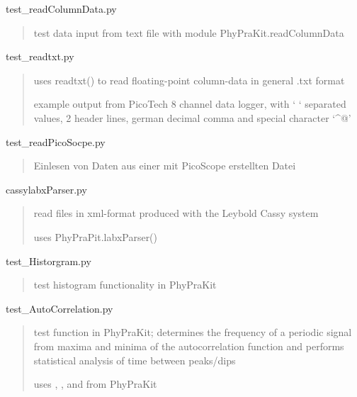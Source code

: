 \documentclass[letterpaper,10pt,english]{sphinxmanual}
\begin{document}
\label{\detokenize{index:module-test_readColumnData}}
test\_readColumnData.py
\begin{quote}

test data input from text file with module PhyPraKit.readColumnData
\end{quote}
\label{\detokenize{index:module-test_readtxt}}
test\_readtxt.py
\begin{quote}

uses readtxt() to read floating-point column-data in general .txt format

example output from PicoTech 8 channel data logger,
with `       ` separated values, 2 header lines,
german decimal comma and special character `\textasciicircum{}@'
\end{quote}
\label{\detokenize{index:module-test_readPicoScope}}
test\_readPicoSocpe.py
\begin{quote}

Einlesen von Daten aus einer mit PicoScope erstellten Datei
\end{quote}
\label{\detokenize{index:module-test_labxParser}}
cassylabxParser.py
\begin{quote}

read files in xml-format produced with the Leybold Cassy system

uses PhyPraPit.labxParser()
\end{quote}
\label{\detokenize{index:module-test_Histogram}}
test\_Historgram.py
\begin{quote}

test histogram functionality in PhyPraKit
\end{quote}
\label{\detokenize{index:module-test_AutoCorrelation}}
test\_AutoCorrelation.py
\begin{quote}

test function  in PhyPraKit; 
determines the frequency of a periodic signal from maxima and minima
of the autocorrelation function and performs statistical analysis
of time between peaks/dips

uses , ,  
and  from PhyPraKit
\end{quote}
\end{document}
